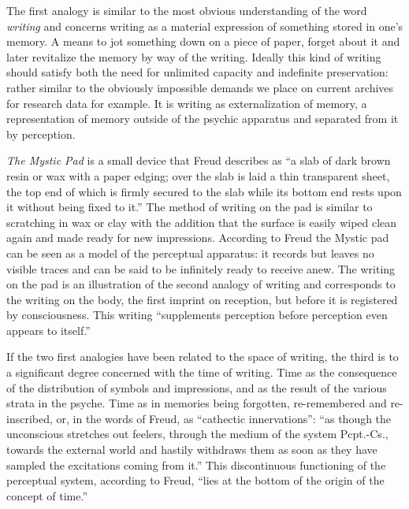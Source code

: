 \documentclass[11pt,a4paper]{article}
\begin{document}
The first analogy is similar to the most obvious understanding of the word \emph{writing} and concerns writing as a material expression of something stored in one's memory. A means to jot something down on a piece of paper, forget about it and later revitalize the memory by way of the writing. Ideally this kind of writing should satisfy both the need for unlimited capacity and indefinite preservation: rather similar to the obviously impossible demands we place on current archives for research data for example. It is writing as externalization of memory, a representation of memory outside of the psychic apparatus and separated from it by perception.

\emph{The Mystic Pad} is a small device that Freud describes as ``a slab of dark brown resin or wax with a paper edging; over the slab is laid a thin transparent sheet, the top end of which is firmly secured to the slab while its bottom end rests upon it without being fixed to it.'' \citep[p. 209]{freud1997} The method of writing on the pad is similar to scratching in wax or clay with the addition that the surface is easily wiped clean again and made ready for new impressions. According to Freud the Mystic pad can be seen as a model of the perceptual apparatus: it records but leaves no visible traces and can be said to be infinitely ready to receive anew. The writing on the pad is an illustration of the second analogy of writing and corresponds to the writing on the body, the first imprint on reception, but before it is registered by consciousness. This writing ``supplements perception before perception even appears to itself.'' \citep[p. 282]{der78}

If the two first analogies have been related to the space of writing, the third is to a significant degree concerned with the time of writing. Time as the consequence of the distribution of symbols and impressions, and as the result of the various strata in the psyche. Time as in memories being forgotten, re-remembered and re-inscribed, or, in the words of Freud, as ``cathectic innervations'': ``as though the unconscious stretches out feelers, through the medium of the system Pcpt.-Cs., towards the external world and hastily withdraws them as soon as they have sampled the excitations coming from it.'' \citep[][p. 211-2]{freud1997} This discontinuous functioning of the perceptual system, according to Freud, ``lies at the bottom of the origin of the concept of time.'' \citep[p. 212]{freud1997}
\end{document}
